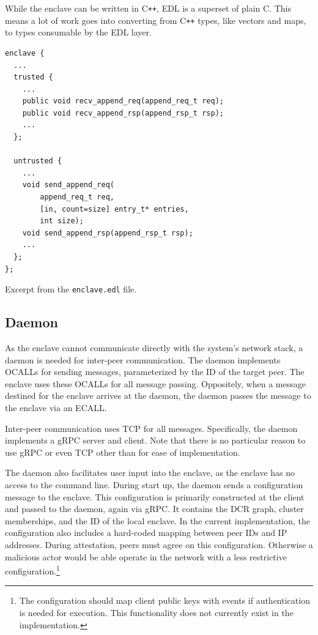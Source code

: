 \documentclass{article}
\newcommand\cpp{C\texttt{++}\xspace}
\begin{document}
	While the enclave can be written in \cpp, EDL is a superset of plain C.
	This means a lot of work goes into converting from \cpp types, like vectors and maps, to types consumable by the EDL layer.

	\begin{snippet}
		\begin{mdframed}[backgroundcolor=Papyrus]
			\begin{lstlisting}[basicstyle=\small\ttfamily]
enclave {
  ...
  trusted {
    ...
    public void recv_append_req(append_req_t req);
    public void recv_append_rsp(append_rsp_t rsp);
    ...
  };

  untrusted {
    ...
    void send_append_req(
    	append_req_t req,
    	[in, count=size] entry_t* entries,
    	int size);
    void send_append_rsp(append_rsp_t rsp);
    ...
  };
};
			\end{lstlisting}
		\end{mdframed}
		\caption{Excerpt from the \texttt{enclave.edl} file.}
		\label{listing:edl}
	\end{snippet}

	\subsection{Daemon}
	As the enclave cannot communicate directly with the system's network stack, a daemon is needed for inter-peer communication.
	The daemon implements OCALLs for sending messages, parameterized by the ID of the target peer.
	The enclave uses these OCALLs for all message passing.
	Oppositely, when a message destined for the enclave arrives at the daemon, the daemon passes the message to the enclave via an ECALL.

	Inter-peer communication uses TCP for all messages.
	Specifically, the daemon implements a gRPC server and client.
	Note that there is no particular reason to use gRPC or even TCP other than for ease of implementation.

	The daemon also facilitates user input into the enclave, as the enclave has no access to the command line.
	During start up, the daemon sends a configuration message to the enclave.
	This configuration is primarily constructed at the client and passed to the daemon, again via gRPC.
	It contains the DCR graph, cluster memberships, and the ID of the local enclave.
	In the current implementation, the configuration also includes a hard-coded mapping between peer IDs and IP addresses.
	During attestation, peers must agree on this configuration.
	Otherwise a malicious actor would be able operate in the network with a less restrictive configuration.\footnote{The configuration should map client public keys with events if authentication is needed for execution. This functionality does not currently exist in the implementation.}
\end{document}
